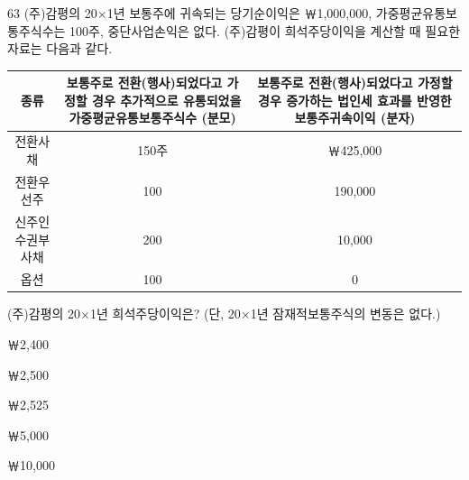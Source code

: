 \begin{question}{63}
(주)감평의 20×1년 보통주에 귀속되는 당기순이익은 ￦1,000,000, 가중평균유통보통주식수는 100주, 중단사업손익은 없다. (주)감평이 희석주당이익을 계산할 때 필요한 자료는 다음과 같다.
\par{\small\centering
\begin{tabular}{|c|c|c|}\hline
종류 & \parbox[c]{0.3\linewidth}{\centering\vspace{2pt}보통주로 전환(행사)되었다고 가정할 경우 추가적으로 유통되었을 가중평균유통보통주식수 (분모)\vspace{2pt}} & \parbox[c]{0.3\linewidth}{\centering\vspace{2pt}보통주로 전환(행사)되었다고 가정할 경우 증가하는 법인세 효과를 반영한 보통주귀속이익 (분자)\vspace{2pt}} \\ \hline
전환사채 & 150주 & ￦425,000 \\ \hline
전환우선주 & 100 & 190,000 \\ \hline
신주인수권부사채 & 200 & 10,000 \\ \hline
옵션 & 100 & 0 \\ \hline
\end{tabular}
\par}
(주)감평의 20×1년 희석주당이익은? (단, 20×1년 잠재적보통주식의 변동은 없다.)
\begin{choices}
  \item ￦2,400
  \item ￦2,500
  \item ￦2,525
  \item ￦5,000
  \item ￦10,000
\end{choices}
\end{question}
